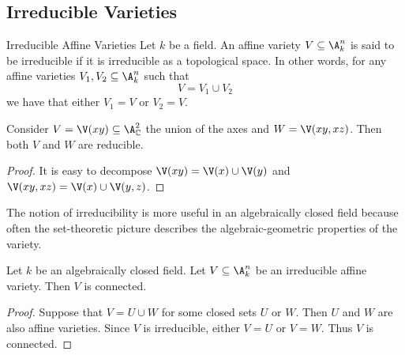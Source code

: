 \documentclass[a4paper]{article}
\begin{document}
\subsection{Irreducible Varieties}
\begin{defn}{Irreducible Affine Varieties}{} Let $k$ be a field. An affine variety $V\subseteq\A_k^n$ is said to be irreducible if it is irreducible as a topological space. In other words, for any affine varieties $V_1,V_2\subseteq\A_k^n$ such that $$V=V_1\cup V_2$$ we have that either $V_1=V$ or $V_2=V$. 
\end{defn}

\begin{eg}{}{} Consider $V=\V(xy)\subseteq\A_\C^2$ the union of the axes and $W=\V(xy,xz)$. Then both $V$ and $W$ are reducible. 
\begin{proof}
It is easy to decompose $\V(xy)=\V(x)\cup\V(y)$ and $\V(xy,xz)=\V(x)\cup\V(y,z)$. 
\end{proof}
\end{eg}

The notion of irreducibility is more useful in an algebraically closed field because often the set-theoretic picture describes the algebraic-geometric properties of the variety. 

\begin{prp}{}{} Let $k$ be an algebraically closed field. Let $V\subseteq\A_k^n$ be an irreducible affine variety. Then $V$ is connected. 
\begin{proof}
Suppose that $V=U\cup W$ for some closed sets $U$ or $W$. Then $U$ and $W$ are also affine varieties. Since $V$ is irreducible, either $V=U$ or $V=W$. Thus $V$ is connected. 
\end{proof}
\end{prp}
\end{document}
